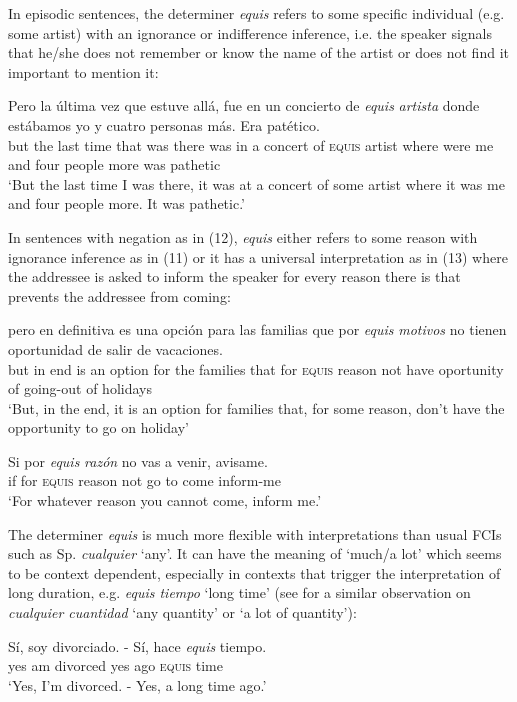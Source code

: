 \documentclass[output=paper
,modfonts
,nonflat]{langsci/langscibook}
\begin{document}
In episodic sentences, the determiner \textit{equis} refers to some specific individual (e.g. some artist) with an ignorance or indifference inference, i.e. the speaker signals that he/she does not remember or know the name of the artist or does not find it important to mention it:

\ea
\gll  Pero la última vez que estuve allá, fue en un concierto de \textit{equis} \textit{artista} donde estábamos yo y cuatro personas más. Era patético.\\
but the last time that was there was in a concert of \textsc{equis} artist where were me and four people more was pathetic
\\
\glt ‘But the last time I was there, it was at a concert of some artist where it was me and four people more. It was pathetic.’
\z

In sentences with negation as in (12), \textit{equis} either refers to some reason with ignorance inference as in (11) or it has a universal interpretation as in (13) where the addressee is asked to inform the speaker for every reason there is that prevents the addressee from coming:

\ea
\gll  pero en definitiva es una opción para las familias que por \textit{equis} \textit{motivos} no tienen oportunidad de salir de vacaciones.\\
but in end is an option for the families that for \textsc{equis} reason not have oportunity of going-out of holidays\\
\glt ‘But, in the end, it is an option for families that, for some reason, don’t have the opportunity to go on holiday’
\z

\ea
\gll  Si por \textit{equis} \textit{razón} no vas a venir, avisame.\\
if for \textsc{equis} reason not go to come inform-me\\
\glt ‘For whatever reason you cannot come, inform me.’
\z

The determiner \textit{equis} is much more flexible with interpretations than usual FCIs such as Sp. \textit{cualquier} ‘any’. It can have the meaning of ‘much/a lot’ which seems to be context dependent, especially in contexts that trigger the interpretation of long duration, e.g. \textit{equis tiempo} ‘long time’ (see \citealt{Rivero2011} for a similar observation on \textit{cualquier cuantidad} ‘any quantity’ or ‘a lot of quantity’):

\ea
\gll Sí, soy divorciado. - Sí, hace \textit{equis} tiempo.\\
yes am divorced {} yes ago \textsc{equis} time\\
\glt ‘Yes, I’m divorced. - Yes, a long time ago.’
\z
\end{document}
